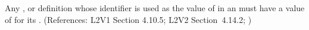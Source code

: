 Any \Compartment, \Species or \Parameter definition whose identifier is
used as the value of  in an \EventAssignment must have a
value of  for its  .  (References: 
L2V1 Section 4.10.5; L2V2 Section~4.14.2; )
